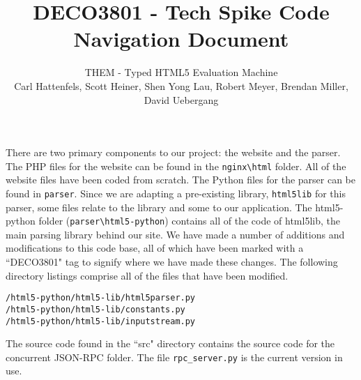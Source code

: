 \documentclass[10pt]{article}
\title{\bf \large DECO3801 - Tech Spike Code Navigation Document}
\author{\normalsize THEM - Typed HTML5 Evaluation Machine \\ \normalsize Carl Hattenfels, Scott Heiner, Shen Yong Lau, Robert Meyer, Brendan Miller, David Uebergang}
\date{}
\begin{document}
\maketitle

There are two primary components to our project: the website and the parser. The PHP files for the website can be found in the \verb'nginx\html' folder. All of the website files have been coded from scratch. The Python files for the parser can be found in \verb'parser'. Since we are adapting a pre-existing library, \verb'html5lib' for this parser, some files relate to the library and some to our application. The html5-python folder (\verb'parser\html5-python') contains all of the code of html5lib, the main parsing library behind our site. We have made a number of additions and modifications to this code base, all of which have been marked with a ``DECO3801" tag to signify where we have made these changes. The following directory listings comprise all of the files that have been modified.

\begin{verbatim}/html5-python/html5-lib/html5parser.py
/html5-python/html5-lib/constants.py
/html5-python/html5-lib/inputstream.py
\end{verbatim}

The source code found in the ``src" directory contains the source code for the concurrent JSON-RPC folder. The file \verb'rpc_server.py' is the current version in use.
\end{document}
